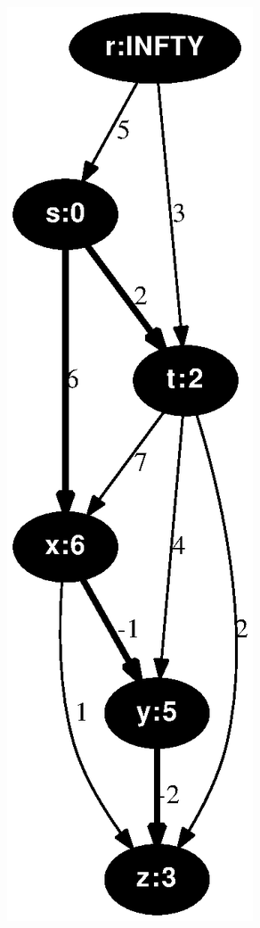\documentclass{article}
\begin{document}
\includegraphics[height=.3\textheight]{dag_shortest_path_06.eps}
\vspace{1em}
\HR
\end{document}
